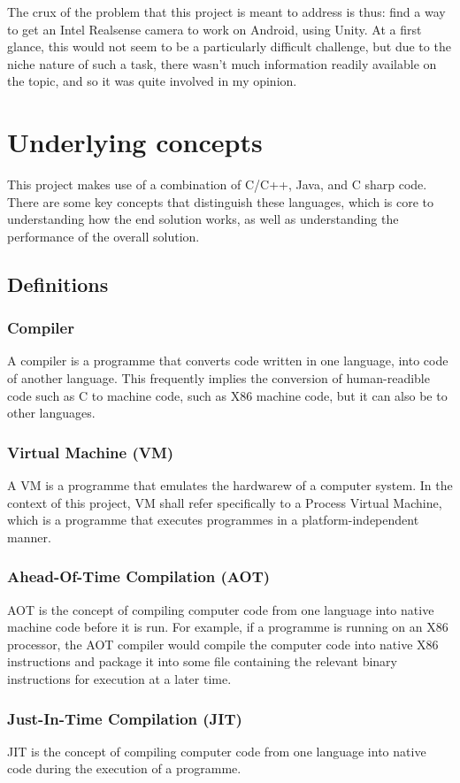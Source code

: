 The crux of the problem that this project is meant to address is thus: find a way to get an Intel Realsense camera to work on Android, using Unity. At a first glance, this would not seem to be a particularly difficult challenge, but due to the niche nature of such a task, there wasn't much information readily available on the topic, and so it was quite involved in my opinion.

\section{Underlying concepts}
This project makes use of a combination of C/C++, Java, and C sharp code. There are some key concepts that distinguish these languages, which is core to understanding how the end solution works, as well as understanding the performance of the overall solution.
    \subsection{Definitions}
        \subsubsection{Compiler} A compiler is a programme that converts code written in one language, into code of another language. This frequently implies the conversion of human-readible code such as C to machine code, such as X86 machine code, but it can also be to other languages.
        \subsubsection{Virtual Machine (VM)} A VM is a programme that emulates the hardwarew of a computer system. In the context of this project, VM shall refer specifically to a Process Virtual Machine, which is a programme that executes programmes in a platform-independent manner.
        \subsubsection{Ahead-Of-Time Compilation (AOT)} AOT is the concept of compiling computer code from one language into native machine code before it is run. For example, if a programme is running on an X86 processor, the AOT compiler would compile the computer code into native X86 instructions and package it into some file containing the relevant binary instructions for execution at a later time.
        \subsubsection{Just-In-Time Compilation (JIT)} JIT is the concept of compiling computer code from one language into native code during the execution of a programme.
